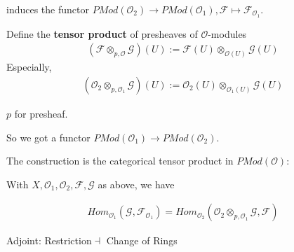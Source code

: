 \documentclass[Total.tex]{subfiles}
\begin{document}
				induces the functor $PMod(\mathcal{O}_2)\rightarrow PMod(\mathcal{O}_1),\mathcal{F}\mapsto \mathcal{F}_{\mathcal{O}_1}$. 
				
				\begin{center}
				\end{center}
				
				\begin{Def}
					Define the \textbf{tensor product} of presheaves of $\mathcal{O}$-modules
					\begin{gather*}
						(\mathcal{F}\otimes_{p,\mathcal{O}} \mathcal{G})(U):=\mathcal{F}(U)\otimes_{\mathcal{O}(U)} \mathcal{G}(U)
					\end{gather*}
					Especially,
					\begin{gather*}
						(\mathcal{O}_2\otimes_{p,\mathcal{O}_1} \mathcal{G})(U):=\mathcal{O}_2(U)\otimes_{\mathcal{O}_1(U)} \mathcal{G}(U)
					\end{gather*}
					
					$p$ for presheaf.
				\end{Def}
				
				So we got a functor $PMod(\mathcal{O}_1)\rightarrow PMod(\mathcal{O}_2)$. 
				
				The construction is the categorical tensor product in $PMod(\mathcal{O})$:{\tiny
					\begin{center}
				\end{center}}
				
				\begin{proposition}
					With $X,\mathcal{O}_1,\mathcal{O}_2,\mathcal{F},\mathcal{G}$ as above, we have
					
					\begin{gather*}
						Hom_{\mathcal{O}_1}(\mathcal{G},\mathcal{F}_{\mathcal{O}_1})=Hom_{\mathcal{O}_2}(\mathcal{O}_2\otimes_{p,\mathcal{O}_1} \mathcal{G},\mathcal{F})
					\end{gather*}
					
					Adjoint: Restriction$\dashv$ Change of Rings
				\end{proposition} 
				
\end{document}
